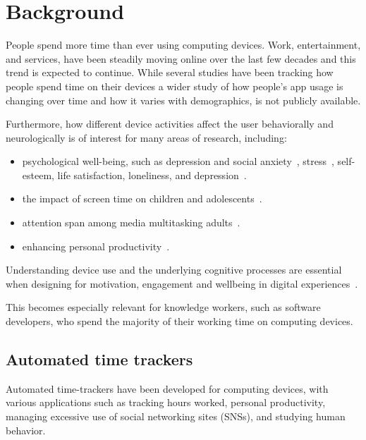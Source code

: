 \section{Background}

People spend more time than ever using computing devices. Work, entertainment, and services, have been steadily moving online over the last few decades and this trend is expected to continue.
While several studies have been tracking how people spend time on their devices a wider study of how people's app usage is changing over time and how it varies with demographics, is not publicly available.

Furthermore, how different device activities affect the user behaviorally and neurologically is of interest for many areas of research, including:

\begin{itemize}
    \item psychological well-being, such as depression and social anxiety~\cite{selfhout_different_2009}\cite{shah_nonrecursive_2002}, stress~\cite{mark_stress_2014}, self-esteem, life satisfaction, loneliness, and depression~\cite{huang_time_2017}.
    \item the impact of screen time on children and adolescents~\cite{subrahmanyam_impact_2001}.
    \item attention span among media multitasking adults~\cite{mark_stress_2014}.
    \item enhancing personal productivity~\cite{kim_timeaware_2016}.
\end{itemize}

Understanding device use and the underlying cognitive processes are essential when designing for motivation, engagement and wellbeing in digital experiences~\cite{peters_designing_2018}.

This becomes especially relevant for knowledge workers, such as software developers, who spend the majority of their working time on computing devices.



\subsection{Automated time trackers}

    Automated time-trackers have been developed for computing devices, with various applications such as tracking hours worked, personal productivity, managing excessive use of social networking sites (SNSs), and studying human behavior.

